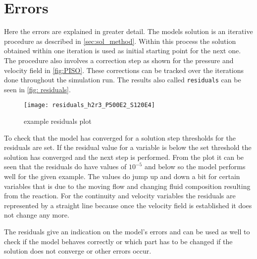 \documentclass[../thesis.tex]{subfiles}
\begin{document}
\section{Errors}
Here the errors are explained in greater detail.
The models solution is an iterative procedure as described in \autoref{sec:sol_method}. Within this process the solution obtained within one iteration is used as initial starting point for the next one. The procedure also involves a correction step as shown for the pressure and velocity field in \autoref{fig:PISO}. These corrections can be tracked over the iterations done throughout the simulation run. The results also called \texttt{residuals} can be seen in \autoref{fig: residuals}.
\begin{figure}[htbp]
	\centering
	\texttt{[image: residuals\_h2r3\_P500E2\_S120E4]}
	\caption{example residuals plot}
	\label{fig: residuals}
\end{figure}
To check that the model has converged for a solution step thresholds for the residuals are set. If the residual value for a variable is below the set threshold the solution has converged and the next step is performed. From the plot it can be seen that the residuals do have values of $10^{-5}$ and below so the model performs well for the given example. The values do jump up and down a bit for certain variables that is due to the moving flow and changing fluid composition resulting from the reaction. For the continuity and velocity variables the residuals are represented by a straight line because once the velocity field is established it does not change any more.

The residuals give an indication on the model's errors and can be used as well to check if the model behaves correctly or which part has to be changed if the solution does not converge or other errors occur.
\end{document}
